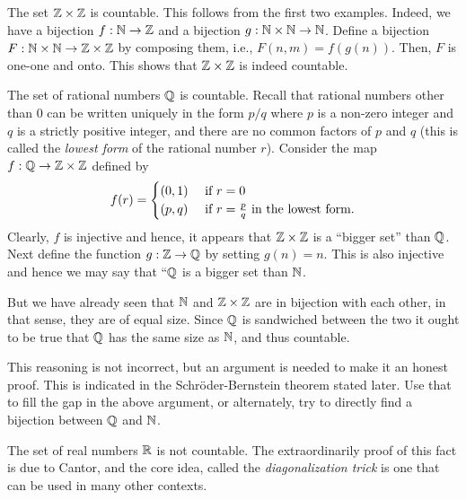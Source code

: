 \documentclass[preprint,  11pt]{amsart}
\begin{document}
\beg The set $\mathbb{Z}\times \mathbb{Z}$ is countable. This follows from the first two examples. Indeed, we have a bijection $f:\mathbb{N}\rightarrow \mathbb{Z}$ and a bijection $g:\mathbb{N}\times \mathbb{N} \rightarrow \mathbb{N}$. Define a bijection $F:\mathbb{N}\times \mathbb{N}\rightarrow \mathbb{Z}\times \mathbb{Z}$ by composing them, i.e., $F(n,m)=f(g(n))$. Then, $F$ is one-one and onto. This shows that $\mathbb{Z}\times \mathbb{Z}$ is indeed countable.
\eeg

\beg The set of rational numbers $\mathbb{Q}$ is countable. Recall that rational numbers other than $0$ can be written uniquely in the form $p/q$ where $p$ is a non-zero integer and $q$ is a strictly positive integer, and there are no common factors of $p$ and $q$ (this is called the {\em lowest form} of the rational number $r$). Consider the map $f:\mathbb{Q}\rightarrow \mathbb{Z}\times \mathbb{Z}$ defined by
$$
f(r) = \begin{cases} (0,1) & \mbox{ if }r=0 \\ (p,q) & \mbox{ if }r=\frac{p}{q} \mbox{ in the lowest form}. \end{cases}
$$
Clearly, $f$ is injective and hence, it appears that $\mathbb{Z}\times \mathbb{Z}$ is a ``bigger set'' than $\mathbb{Q}$. Next define the function $g:\mathbb{Z}\rightarrow \mathbb{Q}$ by setting $g(n)=n$. This is also injective and hence we may say that ``$\mathbb{Q}$ is a bigger set than $\mathbb{N}$. 

But we  have already seen that $\mathbb{N}$ and $\mathbb{Z}\times \mathbb{Z}$ are in bijection with each other, in that sense, they are of equal size. Since $\mathbb{Q}$ is sandwiched between the two it ought to be true that $\mathbb{Q}$ has the same size as $\mathbb{N}$, and thus countable.

This reasoning is not incorrect, but an argument is needed to make it an honest proof. This is indicated in the Schr\"{o}der-Bernstein theorem stated later. Use that to fill the gap in the above argument, or alternately, try to directly find a bijection between $\mathbb{Q}$ and $\mathbb{N}$.
\eeg



\beg The set of real numbers $\mathbb{R}$ is not countable. The extraordinarily proof of this fact is due to Cantor, and the core idea, called the {\em diagonalization trick} is one that can be used in many other contexts. 
\end{document}
